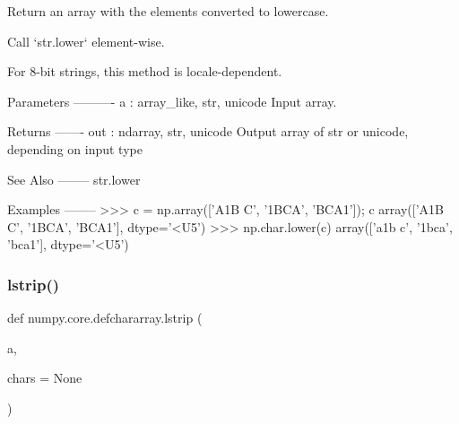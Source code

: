 \begin{DoxyVerb}Return an array with the elements converted to lowercase.

Call `str.lower` element-wise.

For 8-bit strings, this method is locale-dependent.

Parameters
----------
a : array_like, {str, unicode}
    Input array.

Returns
-------
out : ndarray, {str, unicode}
    Output array of str or unicode, depending on input type

See Also
--------
str.lower

Examples
--------
>>> c = np.array(['A1B C', '1BCA', 'BCA1']); c
array(['A1B C', '1BCA', 'BCA1'], dtype='<U5')
>>> np.char.lower(c)
array(['a1b c', '1bca', 'bca1'], dtype='<U5')\end{DoxyVerb}
 \mbox{\label{namespacenumpy_1_1core_1_1defchararray_a27c898d70e469f70c98adce97cb5c655}} 
\subsubsection{\texorpdfstring{lstrip()}{lstrip()}}
{\footnotesize\ttfamily def numpy.\+core.\+defchararray.\+lstrip (\begin{DoxyParamCaption}\item[{}]{a,  }\item[{}]{chars = {\ttfamily None} }\end{DoxyParamCaption})}

